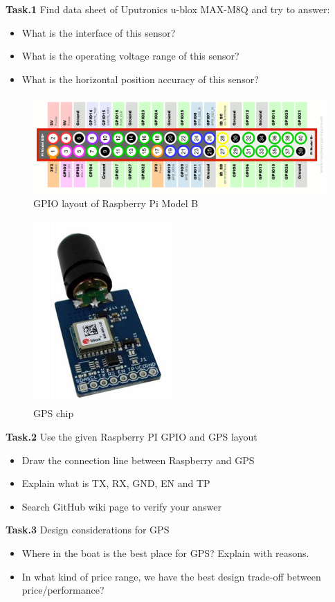 \documentclass[]{article}
\begin{document}
\textbf{Task.1}  Find data sheet of Uputronics u-blox MAX-M8Q and try to answer:
\begin{itemize}
	\item What is the interface of this sensor?
	\item What is the operating voltage range of this sensor?
	\item What is the horizontal position accuracy of this sensor?
\end{itemize}
\begin{figure}[h]
	\centering
	\includegraphics[width=0.7\linewidth]{Raspberry-Pi-GPIO-Layout.png}
	\caption{GPIO layout of Raspberry Pi Model B}
	\label{fig:raspberry-pi-gpio-layout}
\end{figure}
\begin{figure}[h]
\centering
\includegraphics[width=0.3\linewidth]{GPS}
\caption{GPS chip}
\label{fig:gps}
\end{figure}
 \textbf{Task.2} Use the given Raspberry PI GPIO and GPS layout 
 \begin{itemize}
 	\item Draw the connection line between Raspberry and GPS
 	\item Explain what is TX, RX,  GND, EN and TP
 	\item Search GitHub wiki page to verify your answer
 \end{itemize}

\textbf{Task.3} Design considerations for GPS
\begin{itemize}
	\item Where in the boat is the best place for GPS? Explain with reasons.  
	\item  In what kind of price range, we have the best design trade-off between price/performance? 
\end{itemize}
\end{document}
